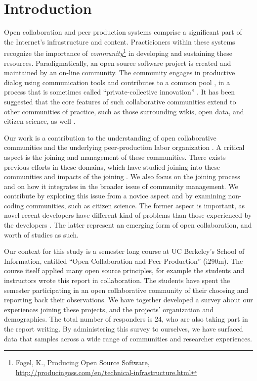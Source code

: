 \section{Introduction}

Open collaboration and peer production systems comprise a significant
part of the Internet's infrastructure and content.
Practicioners within these systems recognize the importance of
\emph{community}\footnote{Fogel, K., Producing Open Source Software, \url{http://producingoss.com/en/technical-infrastructure.html}} in developing and sustaining these resources.
Paradigmatically, an open source software project is created and maintained by an on-line community.
The community engages in productive dialog using communication tools and contributes to
a common pool \cite{ostrom1990}, in a process that is sometimes called ``private-collective innovation'' \cite{vonhippel2003oss}.
It has been suggested that the core features of such collaborative
communities extend to other communities of practice, such as those
surrounding wikis, open data, and citizen science, as well .

Our work is a contribution to the understanding of  open collaborative
communities and the underlying peer-production labor organization \cite{benkler2002} .
A critical aspect is the joining and management of these communities. There exists previous efforts in these domains, which have studied joining into these communities and impacts of the joining \cite{vonKrogh2003,Baldwin2006} .
We also focus on the joining process and on how
it integrates in the broader issue of community management.
We contribute by exploring this issue from a novice aspect and by examining non-coding communities, such as citizen science. The former aspect is important, as novel recent developers have different kind of problems than those experienced by the developers \cite{Begel2008}. The latter represent an emerging form of open collaboration, and worth of studies as such.

Our context for this study is a semester long course at UC Berkeley's School of Information, entitled ``Open Collaboration and Peer Production'' (i290m). The course itself applied many open source principles, for example
the students and instructors wrote this report in collaboration.
The students have spent the semester participating in an open
collaborative community of their choosing and reporting back
their observations.
We have together developed a survey about our experiences joining
these projects, and the projects' organization and demographics. The total number of responders is 24, who are also taking part in the report writing.
By administering this survey to ourselves, we have surfaced data
that samples across a wide range of communities and researcher experiences.

